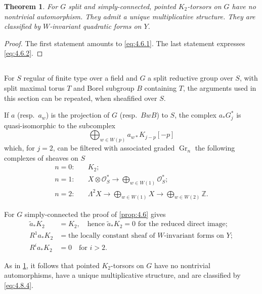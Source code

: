 \documentclass[11pt,a4paper]{article}
\theoremstyle{plain}
\newtheorem{theorem}{Theorem}[section]
\theoremstyle{definition}
\DeclareMathOperator{\Gr}{Gr}
\newcommand{\cO}{\mathcal{O}}
\newcommand{\bZ}{\mathbb{Z}}
\begin{document}
\begin{theorem}\label{thm:4.7}
For $G$ split and simply-connected, pointed $K_2$-torsors on $G$ have no nontrivial automorphism. They admit a unique multiplicative structure. They are classified by $W$-invariant quadratic forms on $Y$.
\end{theorem}

\begin{proof}
The first statement amounts to \eqref{eq:4.6.1}. The last statement expresses \eqref{eq:4.6.2}.
\end{proof}

\subsection{}
For $S$ regular of finite type over a field and $G$ a split reductive group over $S$, with split maximal torus $T$ and Borel subgroup $B$ containing $T$, the arguments used in this section can be repeated, when sheafified over $S$.

If $a$ (resp.~$a_w$) is the projection of $G$ (resp.~$BwB$) to $S$, the complex $a_* G^*_j$ is quasi-isomorphic to the subcomplex
\begin{equation}\label{eq:4.8.1}
\bigoplus_{w \in W(p)} a_{w*} K_{j-p}[-p]
\end{equation}
which, for $j=2$, can be filtered with associated graded $\Gr_n$ the following complexes of sheaves on $S$
\begin{equation}\label{eq:4.8.2}
\begin{aligned}
n=0: &\quad K_2; \\
n=1: &\quad X \otimes \cO^*_S \to \bigoplus_{w \in W(1)} \cO^*_S; \\
n=2: &\quad \Lambda^2 X \to \bigoplus_{w \in W(1)} X \to \bigoplus_{w \in W(2)} \bZ.
\end{aligned}
\end{equation}

For $G$ simply-connected the proof of \ref{prop:4.6} gives
\begin{align}
\tilde{a}_* K_2 &= K_2, \quad \text{hence } \tilde{a}_* K_2 = 0 \text{ for the reduced direct image}; \label{eq:4.8.3} \\
R^1 a_* K_2 &= \text{the locally constant sheaf of $W$-invariant forms on $Y$}; \label{eq:4.8.4} \\
R^i a_* K_2 &= 0 \quad \text{for } i > 2. \label{eq:4.8.5}
\end{align}

As in \ref{thm:4.7}, it follows that pointed $K_2$-torsors on $G$ have no nontrivial automorphisms, have a unique multiplicative structure, and are classified by \eqref{eq:4.8.4}.
\end{document}
